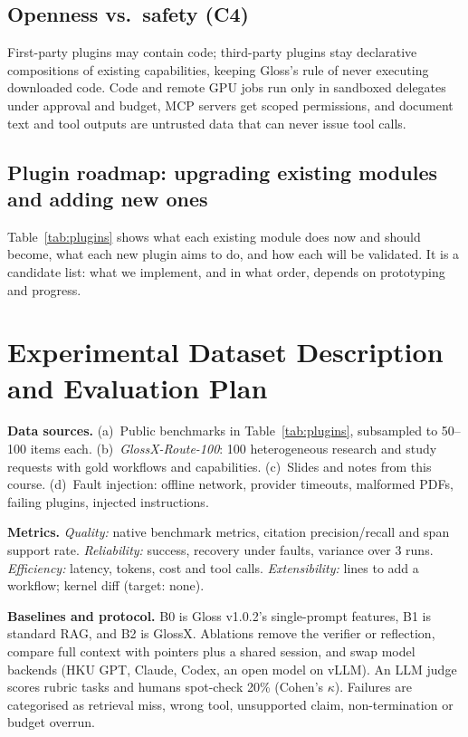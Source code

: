 \documentclass{article}
\newcommand{\sysname}{GlossX}
\newcommand{\gloss}{Gloss}
\begin{document}
\subsection{Openness vs.\ safety (C4)}
First-party plugins may contain code; third-party plugins stay declarative compositions of existing capabilities, keeping \gloss{}'s rule of never executing downloaded code. Code and remote GPU jobs run only in sandboxed delegates under approval and budget, MCP servers get scoped permissions, and document text and tool outputs are untrusted data that can never issue tool calls.

\subsection{Plugin roadmap: upgrading existing modules and adding new ones}
Table~\ref{tab:plugins} shows what each existing module does now and should become, what each new plugin aims to do, and how each will be validated. It is a candidate list: what we implement, and in what order, depends on prototyping and progress.


\section{Experimental Dataset Description and Evaluation Plan}
\label{sec:eval}

\textbf{Data sources.}
(a)~Public benchmarks in Table~\ref{tab:plugins}, subsampled to 50--100 items each.
(b)~\emph{\sysname{}-Route-100}: 100 heterogeneous research and study requests with gold workflows and capabilities.
(c)~Slides and notes from this course.
(d)~Fault injection: offline network, provider timeouts, malformed PDFs, failing plugins, injected instructions.

\textbf{Metrics.}
\emph{Quality:} native benchmark metrics, citation precision/recall and span support rate.
\emph{Reliability:} success, recovery under faults, variance over 3 runs.
\emph{Efficiency:} latency, tokens, cost and tool calls.
\emph{Extensibility:} lines to add a workflow; kernel diff (target: none).

\textbf{Baselines and protocol.}
B0 is \gloss{} v1.0.2's single-prompt features, B1 is standard RAG, and B2 is \sysname{}. Ablations remove the verifier or reflection, compare full context with pointers plus a shared session, and swap model backends (HKU GPT, Claude, Codex, an open model on vLLM). An LLM judge scores rubric tasks and humans spot-check 20\% (Cohen's $\kappa$). Failures are categorised as retrieval miss, wrong tool, unsupported claim, non-termination or budget overrun.
\end{document}
